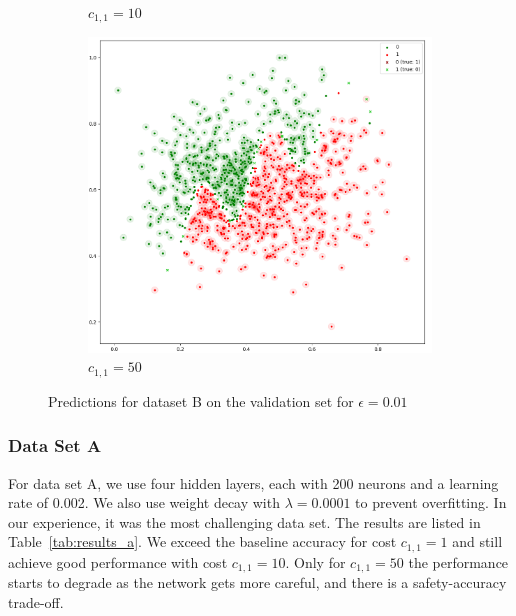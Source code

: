 \documentclass[acmsmall,nonacm]{acmart}
\begin{document}
\begin{figure}[H]
\begin{subfigure}[b]{0.32\textwidth}
      \caption{$c_{1, 1} = 10$}
    \end{subfigure}
    \begin{subfigure}[b]{0.32\textwidth}
      \includegraphics[width=\textwidth]{assets/b-val-cost50-eps0_01}
      \caption{$c_{1, 1} = 50$}
    \end{subfigure}
    \caption{Predictions for dataset B on the validation set for $\epsilon = 0.01$}
    \label{fig:b_val_results}
  \end{figure}

\subsubsection*{Data Set A}
For data set A, we use four hidden layers, each with 200 neurons and a learning rate of 0.002. We also use weight decay with $\lambda=0.0001$ to prevent overfitting. In our experience, it was the most challenging data set. The results are listed in Table~\ref{tab:results_a}. We exceed the baseline accuracy for cost $c_{1, 1} = 1$ and still achieve good performance with cost $c_{1, 1} = 10$. Only for $c_{1, 1} = 50$ the performance starts to degrade as the network gets more careful, and there is a safety-accuracy trade-off. 
\end{document}
